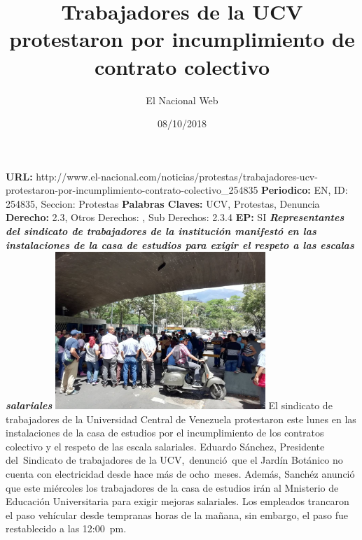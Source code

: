 \documentclass{article}%
\title{\textbf{Trabajadores de la UCV protestaron por incumplimiento de contrato colectivo}}%
\author{El Nacional Web}%
\date{08/10/2018}%
\begin{document}
%
\normalsize%
\maketitle%
\textbf{URL: }%
http://www.el{-}nacional.com/noticias/protestas/trabajadores{-}ucv{-}protestaron{-}por{-}incumplimiento{-}contrato{-}colectivo\_254835\newline%
%
\textbf{Periodico: }%
EN, %
ID: %
254835, %
Seccion: %
Protestas\newline%
%
\textbf{Palabras Claves: }%
UCV, Protestas, Denuncia\newline%
%
\textbf{Derecho: }%
2.3, %
Otros Derechos: %
, %
Sub Derechos: %
2.3.4\newline%
%
\textbf{EP: }%
SI\newline%
\newline%
%
\textbf{\textit{Representantes del sindicato de trabajadores de la institución manifestó en las instalaciones de la casa de estudios para exigir el respeto a las escalas salariales}}%
\newline%
\newline%
%
\includegraphics[width=300px]{3.jpg}%
\newline%
%
El sindicato de trabajadores de la Universidad Central de Venezuela protestaron este lunes en las instalaciones de la casa de estudios por el incumplimiento de los contratos colectivo y el respeto de las escala salariales.%
\newline%
%
Eduardo Sánchez, Presidente del~Sindicato de trabajadores de la UCV,~denunció~que el Jardín Botánico no cuenta con electricidad desde hace más de ocho~meses.%
\newline%
%
Además, Sanchéz anunció que este miércoles los trabajadores de la casa de estudios irán al Mnisterio de Educación Universitaria para exigir mejoras salariales.%
\newline%
%
Los empleados trancaron el paso vehícular desde tempranas horas de la mañana, sin embargo, el paso fue restablecido a las 12:00~pm.%
\newline%
%
\end{document}
